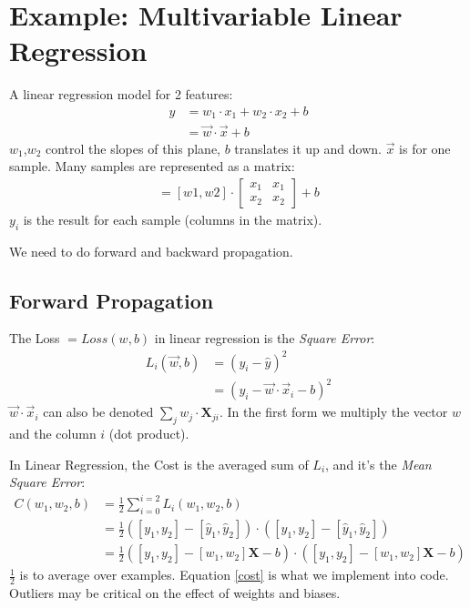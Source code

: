 \section{Example: Multivariable Linear Regression}
A linear regression model for 2 features:
\begin{align*}
 y &= w_1\cdot x_1 + w_2\cdot x_2 + b \\
   &= \vec{w}\cdot\vec{x} + b
\end{align*}
$w_1$,$w_2$ control the slopes of this plane, $b$ translates it up and down. $\vec{x}$ is for one sample. Many samples are represented as a matrix:
\begin{align}
[y1, y2] = 
  [w1, w2]\cdot{}
  \begin{bmatrix}
  x_1 & x_1\\
  x_2 & x_2 
  \end{bmatrix}
 +  b
\end{align}
$y_i$ is the result for each sample (columns in the matrix).

We need to do forward and backward propagation.





\subsection{Forward Propagation}
The Loss $= Loss(w,b)$ in linear regression is the \textit{Square Error}:
\begin{align*}
  L_i(\vec{w}, b) &= (y_i - \hat{y})^2\\
  &=(y_i -\vec{w}\cdot{}\vec{x}_{i} -b)^2
\end{align*}
$\vec{w}\cdot{}\vec{x}_i$ can also be denoted $\sum_jw_j\cdot{}\mathbf{X}_{ji}$. In the first form we multiply the vector $w$ and the column $i$ (dot product).

In Linear Regression, the Cost is the averaged sum of $L_i$, and it's the \textit{Mean Square Error}:
\begin{align}
  C(w_1, w_2, b) &= \frac{1}{2} \sum_{i=0}^{i=2} L_i(w_1, w_2, b)\\
  &= \frac{1}{2}([y_1, y_2] - [\hat{y}_1, \hat{y}_2])\cdot{}([y_1, y_2]-[\hat{y}_1, \hat{y}_2])\\
  &=\frac{1}{2}([y_1, y_2] - [w_1, w_2]\mathbf{X}-b)\cdot{}([y_1, y_2] - [w_1,w_2]\mathbf{X} -b) \label{cost}
\end{align}
$\frac{1}{2}$ is to average over examples. Equation \ref{cost} is what we implement into code.
Outliers may be critical on the effect of weights and biases.


